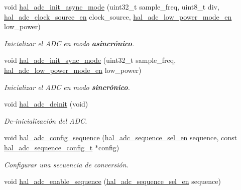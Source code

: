 \begin{DoxyCompactItemize}
\item 
void \hyperlink{group__ADC_ga4a31179837133973ad68fa993a4e3cd0}{hal\+\_\+adc\+\_\+init\+\_\+async\+\_\+mode} (uint32\+\_\+t sample\+\_\+freq, uint8\+\_\+t div, \hyperlink{group__ADC_gaee7bd99d368af2a425a9954a9e811a51}{hal\+\_\+adc\+\_\+clock\+\_\+source\+\_\+en} clock\+\_\+source, \hyperlink{group__ADC_gaf1570443ca3570a7ae83b90307bbecca}{hal\+\_\+adc\+\_\+low\+\_\+power\+\_\+mode\+\_\+en} low\+\_\+power)
\begin{DoxyCompactList}\small\item\em Inicializar el {\itshape A\+DC} en modo {\bfseries asincrónico}. \end{DoxyCompactList}\item 
void \hyperlink{group__ADC_ga952626700075b275e7766c0095e4ec36}{hal\+\_\+adc\+\_\+init\+\_\+sync\+\_\+mode} (uint32\+\_\+t sample\+\_\+freq, \hyperlink{group__ADC_gaf1570443ca3570a7ae83b90307bbecca}{hal\+\_\+adc\+\_\+low\+\_\+power\+\_\+mode\+\_\+en} low\+\_\+power)
\begin{DoxyCompactList}\small\item\em Inicializar el {\itshape A\+DC} en modo {\bfseries sincrónico}. \end{DoxyCompactList}\item 
\mbox{\label{group__ADC_gab7f00d9f916d45943647ae254ac92d24}} 
void \hyperlink{group__ADC_gab7f00d9f916d45943647ae254ac92d24}{hal\+\_\+adc\+\_\+deinit} (void)
\begin{DoxyCompactList}\small\item\em De-\/inicialización del {\itshape A\+DC}. \end{DoxyCompactList}\item 
void \hyperlink{group__ADC_gadcef726eaa85af74ade96c14f9a48feb}{hal\+\_\+adc\+\_\+config\+\_\+sequence} (\hyperlink{group__ADC_ga9297d7b14d7018a94bce94f0103d8559}{hal\+\_\+adc\+\_\+sequence\+\_\+sel\+\_\+en} sequence, const \hyperlink{structhal__adc__sequence__config__t}{hal\+\_\+adc\+\_\+sequence\+\_\+config\+\_\+t} $\ast$config)
\begin{DoxyCompactList}\small\item\em Configurar una secuencia de conversión. \end{DoxyCompactList}\item 
void \hyperlink{group__ADC_ga678f2df33d79c246b175d0dd36405430}{hal\+\_\+adc\+\_\+enable\+\_\+sequence} (\hyperlink{group__ADC_ga9297d7b14d7018a94bce94f0103d8559}{hal\+\_\+adc\+\_\+sequence\+\_\+sel\+\_\+en} sequence)

\end{DoxyCompactItemize}
